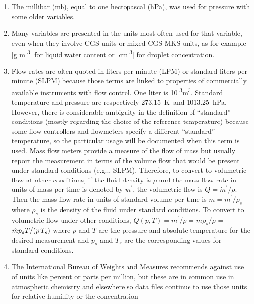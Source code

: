 \documentclass[
  english,
]{book}
\providecommand{\tightlist}{%
  \setlength{\itemsep}{0pt}\setlength{\parskip}{0pt}}
\begin{document}
\begin{enumerate}
\def\labelenumi{\arabic{enumi}.}
\tightlist
\item
  The millibar (mb), equal to one hectopascal (hPa), was used for
  pressure with some older variables.\\
\item
  Many variables are presented in the units most often used for that
  variable, even when they involve CGS units or mixed CGS-MKS units, as
  for example {[}g m\textsuperscript{-3}{]} for liquid water content or
  {[}cm\textsuperscript{-3}{]} for droplet concentration.\\
\item
  Flow rates are often quoted in liters per minute (LPM) or standard
  liters per minute (SLPM) because those terms are linked to properties
  of commercially available instruments with flow control. One liter is
  10\textsuperscript{-3}m\textsuperscript{3}. Standard temperature and
  pressure are respectively 273.15~K~and 1013.25~hPa. However, there is
  considerable ambiguity in the definition of ``standard'' conditions
  (mostly regarding the choice of the reference temperature) because
  some flow controllers and flowmeters specify a different ``standard''
  temperature, so the particular usage will be documented when this term
  is used. Mass flow meters provide a measure of the flow of mass but
  usually report the measurement in terms of the volume flow that would
  be present under standard conditions (e.g.., SLPM). Therefore, to
  convert to volumetric flow at other conditions, if the fluid density
  is \(\rho\) and the mass flow rate in units of mass per time is
  denoted by \(\dot{m}^\prime\), the volumetric flow is
  \(Q=\dot{m}^\prime/\rho\). Then the mass flow rate in units of
  standard volume per time is \(\dot{m}=\dot{m}^\prime/\rho_s\) where
  \(\rho_s\) is the density of the fluid under standard conditions. To
  convert to volumetric flow under other conditions,
  \(Q(p,T)=\dot{m}^\prime/\rho\) = \(\dot{m}\rho_s/\rho\) =
  \(\dot{m}p_{s}T/(p\thinspace T_{s})\) where \(p\) and \(T\) are the
  pressure and absolute temperature for the desired measurement and
  \(p_s\) amd \(T_s\) are the corresponding values for standard
  conditions.\\
\item
  The International Bureau of Weights and Measures recommends against
  use of units like percent or parts per million, but these are in
  common use in atmospheric chemistry and elsewhere so data files
  continue to use those units for relative humidity or the concentration

\end{enumerate}
\end{document}

